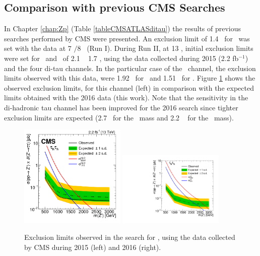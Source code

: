 
\subsection{Comparison with previous CMS Searches}
\label{CMS2015}

In Chapter \ref{chap:Zp} (Table \ref{tableCMSATLASditau}) the results of previous
searches performed by CMS were presented. An exclusion limit of 1.4 \TeV~for 
\ZprimeSSM~was set with the data at 7 \TeV$/$8 \TeV~(Run I). During Run II, at 13 \TeV, initial exclusion 
limits were set for \ZprimeSSM~and \ZprimeTAT~of 2.1 \TeV~ 1.7 \TeV, using the data 
collected during 2015 (2.2 fb$^{-1}$) and the four di-tau channels. In the particular 
case of the \tauh\tauh~channel, the exclusion limits observed with this data,
were 1.92 \TeV~for \ZprimeSSM~and 1.51 \TeV~for \ZprimeTAT. Figure \ref{fig:ComparisonCMStau}
shows the observed exclusion limits, for this channel (left) in comparison 
with the expected limits obtained with the 2016 data (this work). Note that the sensitivity in 
the di-hadronic tau channel has been improved for the 2016 search since 
tighter exclusion limits are expected (2.7 \TeV~for the \ZprimeSSM~mass and 2.2 \TeV~
for the \ZprimeTAT~mass). 


 \begin{figure}[ht]
 \begin{center}
 \captionsetup[subfloat]{farskip=0pt,captionskip=0.0cm,labelformat=empty}
 \includegraphics[clip,width=0.45\textwidth]{figuras/Chapter1/CMSZprime2ditauhRun2.png}
 \includegraphics[clip,width=0.45\textwidth]{figuras/Conclusions/tt_Limits.pdf}
 \end{center}
 \caption{Exclusion limits observed in the search for \Zprimetotauh, using the data collected by CMS during 2015 (left)
 and 2016 (right).}
 \label{fig:ComparisonCMStau}
 \end{figure}

